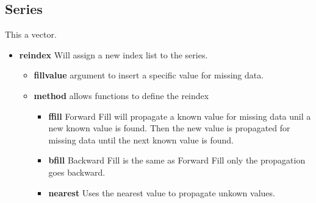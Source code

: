 \subsection{Series}
This a vector.
\begin{itemize}
  \item \textbf{reindex} Will assign a new index list to the series.
    \begin{itemize}
      \item \textbf{fill\textunderscore value} argument to insert a specific
        value for missing data.
      \item \textbf{method} allows functions to define the reindex
        \begin{itemize}
          \item \textbf{ffill} Forward Fill will propagate a known value for
            missing data unil a new known value is found.  Then the new value
            is propagated for missing data until the next known value is found.
          \item \textbf{bfill} Backward Fill is the same as Forward Fill only
            the propagation goes backward.
          \item \textbf{nearest} Uses the nearest value to propagate unkown
            values.
        \end{itemize}
    \end{itemize}
\end{itemize}
